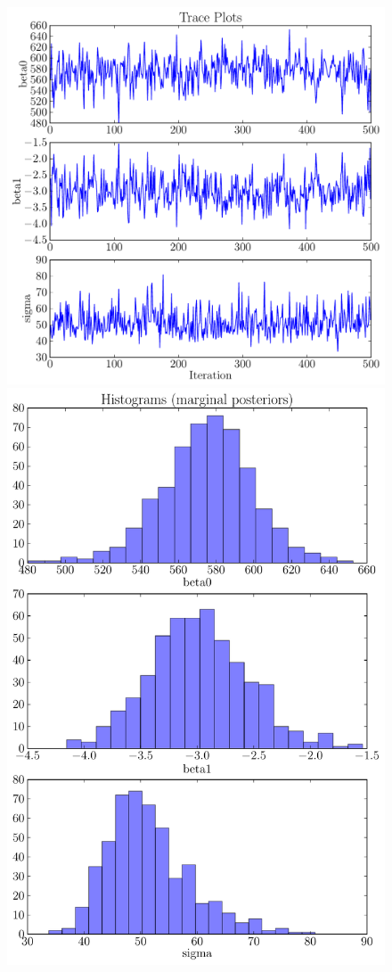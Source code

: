 \begin{figure}[ht!]
\begin{center}
\includegraphics[scale=0.35]{Figures/road_trace.pdf}
\includegraphics[scale=0.35]{Figures/road_hist.pdf}

\end{center}
\end{figure}
